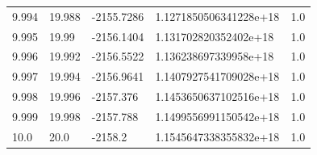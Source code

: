 \begin{tabular}{lllll}
9.994 & 19.988 & -2155.7286 & 1.1271850506341228e+18 & 1.0 \\
9.995 & 19.99 & -2156.1404 & 1.131702820352402e+18 & 1.0 \\
9.996 & 19.992 & -2156.5522 & 1.136238697339958e+18 & 1.0 \\
9.997 & 19.994 & -2156.9641 & 1.1407927541709028e+18 & 1.0 \\
9.998 & 19.996 & -2157.376 & 1.1453650637102516e+18 & 1.0 \\
9.999 & 19.998 & -2157.788 & 1.1499556991150542e+18 & 1.0 \\
10.0 & 20.0 & -2158.2 & 1.1545647338355832e+18 & 1.0 \\
\bottomrule
\end{tabular}
